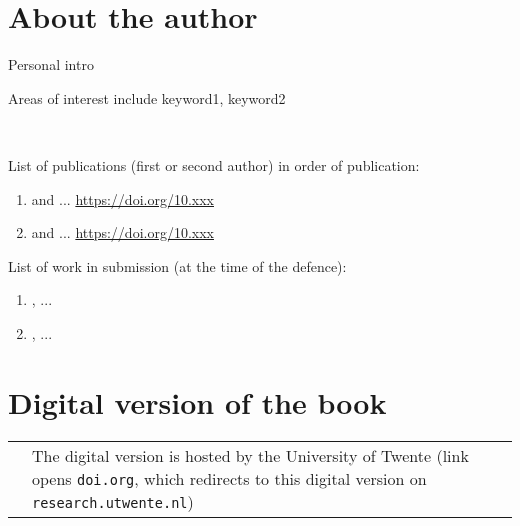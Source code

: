 \cleardoublepage
\thispagestyle{empty}
\section*{About the author}

{\footnotesize
Personal intro

\vspace{0.2cm}
Areas of interest include keyword1, keyword2}
\vspace{0.1cm}
\\
{\scriptsize
List of publications (first or second author) in order of publication:
\begin{enumerate}
    \item \textbf{\theauthor} and ... \url{https://doi.org/10.xxx}
    \item \textbf{\theauthor} and ... \url{https://doi.org/10.xxx}
    
\end{enumerate}
List of work in submission (at the time of the defence): %
\begin{enumerate}
    \item \textbf{\theauthor}, ...
    \item \textbf{\theauthor}, ...
\end{enumerate}
}

\clearpage
\thispagestyle{empty}
\section*{Digital version of the book}

{\footnotesize
    \begin{table}[h]
        \centering
        \renewcommand{\arraystretch}{1.5} %
        \begin{tabular}{>{\centering\arraybackslash}m{5cm} >{\centering\arraybackslash}m{7cm}}
            &
            The digital version is hosted by the University of Twente (link opens \texttt{doi.org}, which redirects to this digital version on \texttt{research.utwente.nl})
        \end{tabular}
        \label{tab:qr_code}
    \end{table}
}